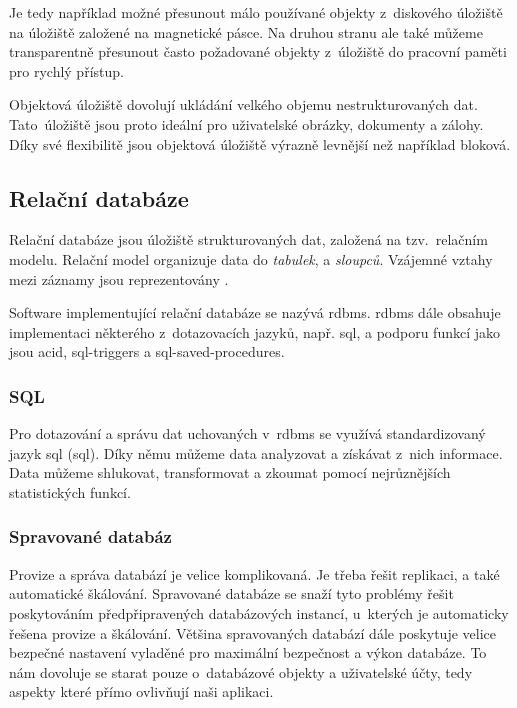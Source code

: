 Je tedy například možné přesunout málo používané objekty z~diskového úložiště na úložiště založené na magnetické pásce. Na druhou stranu ale také můžeme transparentně přesunout často požadované objekty z~úložiště do pracovní paměti pro rychlý přístup.

Objektová úložiště dovolují ukládání velkého objemu nestrukturovaných dat.
Tato úložiště jsou proto ideální pro uživatelské obrázky, dokumenty a zálohy.
Díky své flexibilitě jsou objektová úložiště výrazně levnější než například bloková.

\subsection{Relační databáze}

Relační databáze\cite{relational-database} jsou úložiště strukturovaných dat, založená na tzv.\ relačním modelu. Relační model organizuje data do \emph{tabulek},  a \emph{sloupců}. Vzájemné vztahy mezi záznamy jsou reprezentovány . 

Software implementující relační databáze se nazývá \acrfull{rdbms}. \acrshort{rdbms} dále obsahuje implementaci některého z~dotazovacích jazyků, např. \acrshort{sql}, a podporu funkcí jako jsou \acrshort{acid}, \glspl{sql-trigger} a \glspl{sql-saved-procedure}.

\subsubsection{SQL}

Pro dotazování a správu dat uchovaných v~\acrshort{rdbms} se využívá standardizovaný jazyk \acrshort{sql} (\acrlong{sql})\cite{sql}. Díky němu můžeme data analyzovat a získávat z~nich informace. Data můžeme shlukovat, transformovat a zkoumat pomocí nejrůznějších statistických funkcí.

\subsubsection{Spravované databáz}\label{subsub:managed-databases}

Provize a správa databází je velice komplikovaná. Je třeba řešit replikaci, a také automatické škálování. Spravované databáze\cite{managed-databases} se snaží tyto problémy řešit poskytováním předpřipravených databázových instancí, u~kterých je automaticky řešena provize a škálování. Většina spravovaných databází dále poskytuje velice bezpečné nastavení vyladěné pro maximální bezpečnost a výkon databáze. To nám dovoluje se starat pouze o~databázové objekty a uživatelské účty, tedy aspekty které přímo ovlivňují naši aplikaci.

